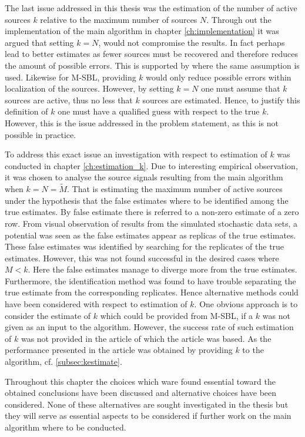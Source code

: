 The last issue addressed in this thesis was the estimation of the number of active sources $k$ relative to the maximum number of sources $N$. Through out the implementation of the main algorithm in chapter \ref{ch:implementation} it was argued that setting $k = N$, would not compromise the results. 
In fact perhaps lead to better estimates as fewer sources must be recovered and therefore reduces the amount of possible errors.
This is supported by \cite{Balkan2014} where the same assumption is used.
Likewise for M-SBL, providing $k$ would only reduce possible errors within localization of the sources.
However, by setting $k = N$ one must assume that $k$ sources are active, thus no less that $k$ sources are estimated. 
Hence, to justify this definition of $k$ one must have a qualified guess with respect to the true $k$. 
However, this is the issue addressed in the problem statement, as this is not possible in practice.    

To address this exact issue an investigation with respect to estimation of $k$ was conducted in chapter \ref{ch:estimation_k}. 
Due to interesting empirical observation, it was chosen to analyse the source signals resulting from the main algorithm when $k = N = \widetilde{M}$. 
That is estimating the maximum number of active sources under the hypothesis that the false estimates where to be identified among the true estimates. By false estimate there is referred to a non-zero estimate of a zero row. 
From visual observation of results from the simulated stochastic data sets, a potential was seen as the false estimates appear as replicas of the true estimates. 
These false estimates was identified by searching for the replicates of the true estimates.
However, this was not found successful in the desired cases where $M < k$. 
Here the false estimates manage to diverge more from the true estimates. 
Furthermore, the identification method was found to have trouble separating the true estimate from the corresponding replicates.
Hence alternative methods could have been considered with respect to estimation of $k$. 
One obvious approach is to consider the estimate of $k$ which could be provided from M-SBL, if a $k$ was not given as an input to the algorithm. 
However, the success rate of such estimation of $k$ was not provided in the article \cite{Balkan2014} of which the article was based. As the performance presented in the article was obtained by providing $k$ to the algorithm, cf. \ref{subsec:kestimate}.   

Throughout this chapter the choices which ware found essential toward the obtained conclusions have been discussed and alternative choices have been considered. 
None of these alternatives are sought investigated in the thesis but they will serve as essential aspects to be considered if further work on the main algorithm where to be conducted. 
